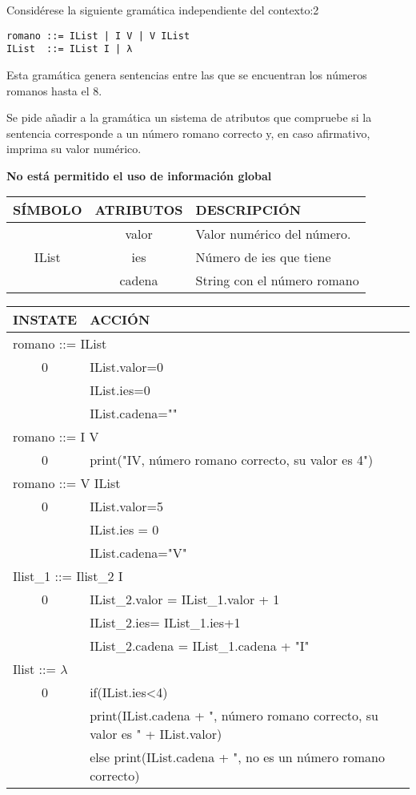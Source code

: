 \documentclass[nochap]{apuntes}
\begin{document}
\begin{problem}
Considérese la siguiente gramática independiente del contexto:2
\begin{verbatim}
romano ::= IList | I V | V IList
IList  ::= IList I | λ
\end{verbatim}
Esta gramática genera sentencias entre las que se encuentran los números romanos hasta el 8.

Se pide añadir a la gramática un sistema de atributos que compruebe si la sentencia corresponde a un número romano correcto y, en caso afirmativo, imprima su valor numérico.

\textbf{No está permitido el uso de información global}
\solution

\begin{tabular}{|c|c|l|}
\hline
SÍMBOLO & ATRIBUTOS & DESCRIPCIÓN \\
\hline
 & valor & Valor numérico del número. \\
\cline{2-3}
IList & ies & Número de ies que tiene \\
\cline{2-3}
 & cadena & String con el número romano \\
\hline
 
\end{tabular}

\begin{tabular}{|c|l|}
\hline
INSTATE & ACCIÓN \\
\hline
\multicolumn{2}{|l|}{romano ::= IList} \\
\hline
 0 & IList.valor=0\\ & IList.ies=0 \\ & IList.cadena=""\\
 \hline
\multicolumn{2}{|l|}{romano ::= I V} \\
\hline
 0 & print("IV, número romano correcto, su valor es 4")\\
\hline
\multicolumn{2}{|l|}{romano ::= V IList} \\
\hline
 0 & IList.valor=5\\ &  IList.ies = 0\\ & IList.cadena="V"\\
\hline
\multicolumn{2}{|l|}{Ilist\_1 ::= Ilist\_2 I}\\
\hline
 0 & IList\_2.valor = IList\_1.valor + 1\\ & IList\_2.ies= IList\_1.ies+1\\ & IList\_2.cadena = IList\_1.cadena + "I"\\
\hline
\multicolumn{2}{|l|}{Ilist ::= $\lambda$}\\
\hline
0 & if(IList.ies<4) \\& print(IList.cadena + ", número romano correcto, su valor es " + IList.valor) \\ & else print(IList.cadena + ", no es un número romano correcto)\\
\hline


\end{tabular}

\end{problem}
\end{document}
